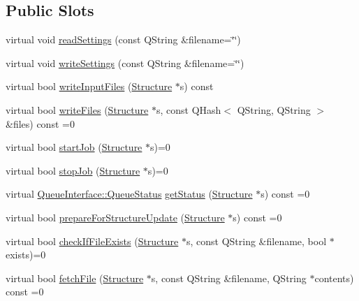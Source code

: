 \subsection*{Public Slots}
\begin{DoxyCompactItemize}
\item 
virtual void \hyperlink{classGlobalSearch_1_1QueueInterface_a6f52e6123a0963a759a18e01804360ac}{read\-Settings} (const Q\-String \&filename=\char`\"{}\char`\"{})
\item 
virtual void \hyperlink{classGlobalSearch_1_1QueueInterface_a2ca92e5132d02e5eda672d2904779a3c}{write\-Settings} (const Q\-String \&filename=\char`\"{}\char`\"{})
\item 
virtual bool \hyperlink{classGlobalSearch_1_1QueueInterface_a4f0c5df9f5945c9c5a64cdf47b7834fa}{write\-Input\-Files} (\hyperlink{classGlobalSearch_1_1Structure}{Structure} $\ast$s) const 
\item 
virtual bool \hyperlink{classGlobalSearch_1_1QueueInterface_a8850904265fa4f397aa37fce9b548829}{write\-Files} (\hyperlink{classGlobalSearch_1_1Structure}{Structure} $\ast$s, const Q\-Hash$<$ Q\-String, Q\-String $>$ \&files) const =0
\item 
virtual bool \hyperlink{classGlobalSearch_1_1QueueInterface_a70a6aa40639e36575a90ffd17c595f55}{start\-Job} (\hyperlink{classGlobalSearch_1_1Structure}{Structure} $\ast$s)=0
\item 
virtual bool \hyperlink{classGlobalSearch_1_1QueueInterface_ab61d5cc09730f42f225571f6865ed383}{stop\-Job} (\hyperlink{classGlobalSearch_1_1Structure}{Structure} $\ast$s)=0
\item 
virtual \hyperlink{classGlobalSearch_1_1QueueInterface_a08dcf06d1b99f6333472470490ca9a6d}{Queue\-Interface\-::\-Queue\-Status} \hyperlink{classGlobalSearch_1_1QueueInterface_a8294808ad1612f2b6fccd932a9d7fd35}{get\-Status} (\hyperlink{classGlobalSearch_1_1Structure}{Structure} $\ast$s) const =0
\item 
virtual bool \hyperlink{classGlobalSearch_1_1QueueInterface_ac3a92214ace255b679951f5a5ef9a11c}{prepare\-For\-Structure\-Update} (\hyperlink{classGlobalSearch_1_1Structure}{Structure} $\ast$s) const =0
\item 
virtual bool \hyperlink{classGlobalSearch_1_1QueueInterface_ab9ea013a587a597749be3efbe035eff8}{check\-If\-File\-Exists} (\hyperlink{classGlobalSearch_1_1Structure}{Structure} $\ast$s, const Q\-String \&filename, bool $\ast$exists)=0
\item 
virtual bool \hyperlink{classGlobalSearch_1_1QueueInterface_ac8af84b05ee61d8c9bb6f1648cc5f221}{fetch\-File} (\hyperlink{classGlobalSearch_1_1Structure}{Structure} $\ast$s, const Q\-String \&filename, Q\-String $\ast$contents) const =0

\end{DoxyCompactItemize}
